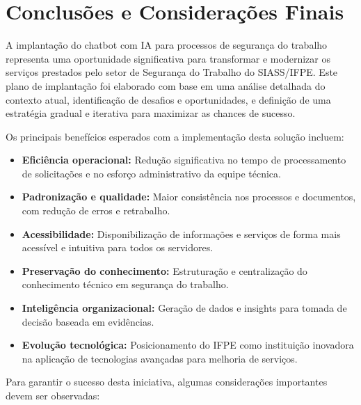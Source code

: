 \documentclass[12pt,a4paper]{article}
\begin{document}
\section{Conclusões e Considerações Finais}

A implantação do chatbot com IA para processos de segurança do trabalho representa uma oportunidade significativa para transformar e modernizar os serviços prestados pelo setor de Segurança do Trabalho do SIASS/IFPE. Este plano de implantação foi elaborado com base em uma análise detalhada do contexto atual, identificação de desafios e oportunidades, e definição de uma estratégia gradual e iterativa para maximizar as chances de sucesso.

Os principais benefícios esperados com a implementação desta solução incluem:

\begin{itemize}
    \item \textbf{Eficiência operacional:} Redução significativa no tempo de processamento de solicitações e no esforço administrativo da equipe técnica.
    
    \item \textbf{Padronização e qualidade:} Maior consistência nos processos e documentos, com redução de erros e retrabalho.
    
    \item \textbf{Acessibilidade:} Disponibilização de informações e serviços de forma mais acessível e intuitiva para todos os servidores.
    
    \item \textbf{Preservação do conhecimento:} Estruturação e centralização do conhecimento técnico em segurança do trabalho.
    
    \item \textbf{Inteligência organizacional:} Geração de dados e insights para tomada de decisão baseada em evidências.
    
    \item \textbf{Evolução tecnológica:} Posicionamento do IFPE como instituição inovadora na aplicação de tecnologias avançadas para melhoria de serviços.
\end{itemize}

Para garantir o sucesso desta iniciativa, algumas considerações importantes devem ser observadas:
\end{document}
